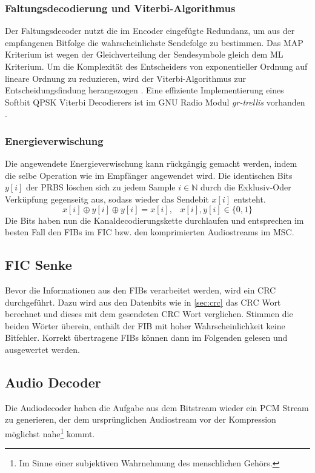 \subsubsection{Faltungsdecodierung und Viterbi-Algorithmus}
Der Faltungsdecoder nutzt die im Encoder eingefügte Redundanz, um aus der empfangenen Bitfolge die wahrscheinlichste Sendefolge zu bestimmen. Das \ac{MAP} Kriterium ist wegen der Gleichverteilung der Sendesymbole gleich dem \ac{ML} Kriterium. Um die Komplexität des Entscheiders von exponentieller Ordnung auf lineare Ordnung zu reduzieren, wird der Viterbi-Algorithmus zur Entscheidungsfindung herangezogen \cite{nt1}. Eine effiziente Implementierung eines Softbit QPSK Viterbi Decodierers ist im GNU Radio Modul \textit{gr-trellis} vorhanden \cite{repo:gr-trellis}.

\subsubsection{Energieverwischung}
Die angewendete Energieverwischung kann rückgängig gemacht werden, indem die selbe Operation wie im Empfänger angewendet wird. Die identischen Bits $y[i]$ der \ac{PRBS} löschen sich zu jedem Sample $i \in \mathbb{N}$ durch die Exklusiv-Oder Verküpfung gegenseitg aus, sodass wieder das Sendebit $x[i]$ entsteht.
\begin{equation}
    x[i] \oplus y[i] \oplus y[i] = x[i], \; \; \; x[i],y[i] \in \{0,1\}
\end{equation}
Die Bits haben nun die Kanaldecodierungskette durchlaufen und entsprechen im besten Fall den FIBs im FIC bzw. den komprimierten Audiostreams im MSC.

\subsection{FIC Senke}
Bevor die Informationen aus den FIBs verarbeitet werden, wird ein \ac{CRC} durchgeführt. Dazu wird aus den Datenbits wie in \ref{sec:crc} das CRC Wort berechnet und dieses mit dem gesendeten CRC Wort verglichen. Stimmen die beiden Wörter überein, enthält der FIB mit hoher Wahrscheinlichkeit keine Bitfehler. Korrekt übertragene FIBs können dann im Folgenden gelesen und ausgewertet werden.

\subsection{Audio Decoder}
Die Audiodecoder haben die Aufgabe aus dem Bitstream wieder ein PCM Stream zu generieren, der dem ursprünglichen Audiostream vor der Kompression möglichst nahe\footnote{Im Sinne einer subjektiven Wahrnehmung des menschlichen Gehörs.} kommt.
